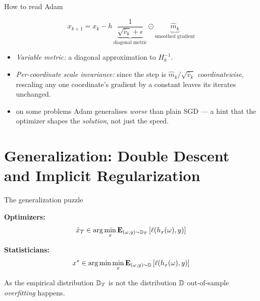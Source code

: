 \documentclass[9pt]{beamer}
\newcommand{\had}{\odot}
\begin{document}
\begin{frame}{How to read Adam}

  \[
    x_{k+1} = x_k - h\, \underbrace{\frac{1}{\sqrt{\hat v_k}+\epsilon}}_{\text{diagonal metric}} \had \underbrace{\hat m_k}_{\text{smoothed gradient}}
  \]

  \vfill

  \begin{itemize}
    \setlength\itemsep{0.6em}
  \item \emph{Variable metric:} a diagonal approximation to $H_k^{-1}$.
  \item \emph{Per-coordinate scale invariance:} since the step is
    $\hat m_k/\sqrt{\hat v_k}$ \emph{coordinatewise}, rescaling any one coordinate's
    gradient by a constant leaves {its} iterates unchanged.
  \item<2->  on some problems Adam generalises \emph{worse} than plain SGD
    --- a hint that the optimizer shapes the \emph{solution}, not just the speed.
  \end{itemize}

\end{frame}

\section{Generalization: Double Descent and Implicit Regularization}

\begin{frame}{The generalization puzzle}

  \textbf{Optimizers:}
  \[
    \hat x_T \in \arg\min_{x}\mathbf{E}_{(\omega,y)\sim \mathbb D_T} \left[ \ell(h_x(\omega),y) \right]
  \]

  \vfill

  \textbf{Statisticians:}
  \[
    x^\star \in \arg\min \min_{x}\mathbf{E}_{(\omega,y)\sim \mathbb D} \left[ \ell(h_x(\omega),y) \right]
  \]

  \vfill

  As the empirical distribution $\mathbb D_T$ is not the distribution $\mathbb D$ out-of-sample \emph{overfitting} happens.





\end{frame}
\end{document}
